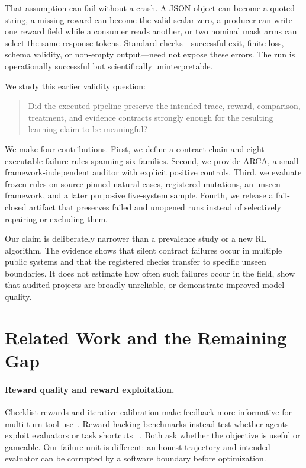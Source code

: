 \documentclass[10pt]{article}
\newcommand{\arca}{\textsc{ARCA}}
\begin{document}
That assumption can fail without a crash.  A JSON object can become a quoted
string, a missing reward can become the valid scalar zero, a producer can write
one reward field while a consumer reads another, or two nominal mask arms can
select the same response tokens.  Standard checks---successful exit, finite
loss, schema validity, or non-empty output---need not expose these errors.  The
run is operationally successful but scientifically uninterpretable.

We study this earlier validity question:

\begin{quote}
Did the executed pipeline preserve the intended trace, reward, comparison,
treatment, and evidence contracts strongly enough for the resulting learning
claim to be meaningful?
\end{quote}

We make four contributions.  First, we define a contract chain and eight
executable failure rules spanning six families.  Second, we provide \arca, a
small framework-independent auditor with explicit positive controls.  Third,
we evaluate frozen rules on source-pinned natural cases, registered mutations,
an unseen framework, and a later purposive five-system sample.  Fourth, we
release a fail-closed artifact that preserves failed and unopened runs instead
of selectively repairing or excluding them.

Our claim is deliberately narrower than a prevalence study or a new RL
algorithm.  The evidence shows that silent contract failures occur in multiple
public systems and that the registered checks transfer to specific unseen
boundaries.  It does not estimate how often such failures occur in the field,
show that audited projects are broadly unreliable, or demonstrate improved
model quality.

\section{Related Work and the Remaining Gap}

\paragraph{Reward quality and reward exploitation.}
Checklist rewards and iterative calibration make feedback more informative
for multi-turn tool use~\citep{zhang2026cm2,modecrua2026irc}.  Reward-hacking
benchmarks instead test whether agents exploit evaluators or task shortcuts
~\citep{thaman2026rhb}.  Both ask whether the objective is useful or gameable.
Our failure unit is different: an honest trajectory and intended evaluator can
be corrupted by a software boundary before optimization.
\end{document}
